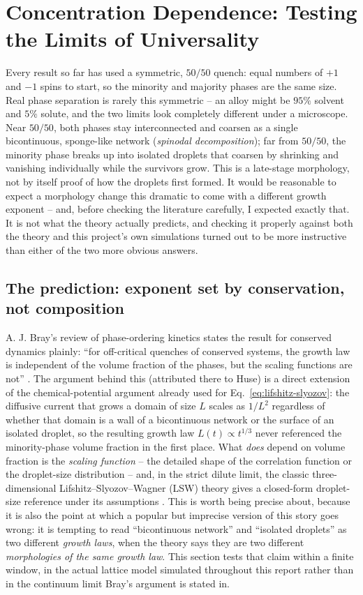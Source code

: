 \documentclass[11pt]{article}
\begin{document}
\section{Concentration Dependence: Testing the Limits of Universality}
\label{sec:concentration}

Every result so far has used a symmetric, $50/50$ quench: equal numbers of
$+1$ and $-1$ spins to start, so the minority and majority phases are the
same size. Real phase separation is rarely this symmetric -- an alloy
might be $95\%$ solvent and $5\%$ solute, and the two limits look
completely different under a microscope. Near $50/50$, both phases stay
interconnected and coarsen as a single bicontinuous, sponge-like network
(\emph{spinodal decomposition}); far from $50/50$, the minority phase
breaks up into isolated droplets that coarsen by shrinking and vanishing
individually while the survivors grow. This is a late-stage morphology,
not by itself proof of how the droplets first formed. It would be reasonable to
expect a morphology change this dramatic to come with a different growth
exponent -- and, before checking the literature carefully, I expected
exactly that. It is not what the theory actually predicts, and checking
it properly against both the theory and this project's own simulations
turned out to be more instructive than either of the two more obvious
answers.

\subsection{The prediction: exponent set by conservation, not composition}

A. J. Bray's review of phase-ordering kinetics states the result for
conserved dynamics plainly: ``for off-critical quenches of conserved
systems, the growth law is independent of the volume fraction of the
phases, but the scaling functions are not'' \cite{Bray1994}. The argument
behind this (attributed there to Huse) is a direct extension of the
chemical-potential argument already used for Eq.~\eqref{eq:lifshitz-slyozov}:
the diffusive current that grows a domain of size $L$ scales as
$1/L^2$ regardless of whether that domain is a wall of a bicontinuous
network or the surface of an isolated droplet, so the resulting growth
law $L(t)\propto t^{1/3}$ never referenced the minority-phase volume
fraction in the first place. What \emph{does} depend on volume fraction is
the \emph{scaling function} -- the detailed shape of the correlation
function or the droplet-size distribution -- and, in the strict dilute
limit, the classic three-dimensional Lifshitz--Slyozov--Wagner (LSW)
theory gives a closed-form droplet-size reference under its assumptions
\cite{LifshitzSlyozov1961}. This is worth being
precise about, because it is also the point at which a popular but
imprecise version of this story goes wrong: it is tempting to read
``bicontinuous network'' and ``isolated droplets'' as two different
\emph{growth laws}, when the theory says they are two different
\emph{morphologies of the same growth law}. This section tests that
claim within a finite window, in the actual lattice model simulated throughout this
report rather than in the continuum limit Bray's argument is stated in.
\end{document}
